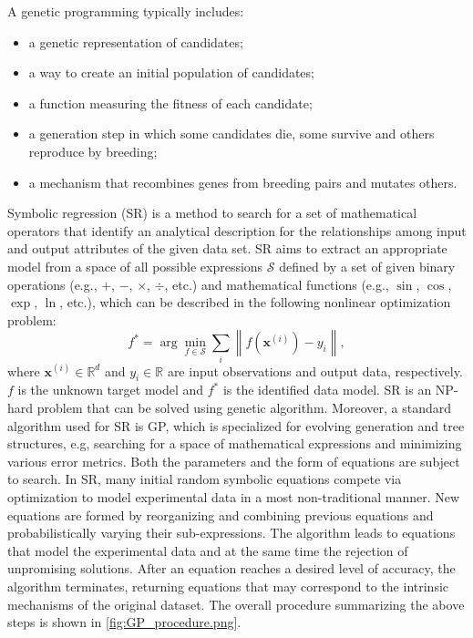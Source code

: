 \documentclass[final,5p,times,twocolumn]{elsarticle}
\begin{document}
A genetic programming typically includes:

\begin{itemize}
	\item{a genetic representation of candidates;}
	\item{a way to create an initial population of candidates;}
	\item{a function measuring the fitness of each candidate;}
	\item{a generation step in which some candidates die, some survive and others reproduce by breeding;}
	\item{a mechanism that recombines genes from breeding pairs and mutates others.}
\end{itemize}



Symbolic regression (SR) is a method to search for a set of mathematical operators that identify an analytical description for the relationships among input and output attributes of the given data set. SR aims to extract an appropriate model from a space of all possible expressions $\mathcal{S}$ defined by a set of given binary operations (e.g., $+$, $-$, $\times$, $\div$, etc.) and mathematical functions (e.g., $\sin$, $\cos$, $\exp$, $\ln$, etc.), which can be described in the following nonlinear optimization problem:
\begin{equation}
\label{SRdef}
f^*=\arg\min_{f \in \mathcal{S}}\sum_i\left\|{f(\mathbf{x}^{(i)})-y_i}\right\|,
\end{equation}
where $\mathbf{x}^{(i)}\in{\mathbb{R}^d}$ and $y_i\in{\mathbb{R}}$ are input observations and output data, respectively. $f$ is the unknown target model and $f^*$ is the identified data model. SR is an NP-hard problem that can be solved using genetic algorithm. Moreover, a standard algorithm used for SR is GP, which is specialized for evolving generation and tree structures, e.g, searching for a space of mathematical expressions and minimizing various error metrics. Both the parameters and the form of equations are subject to search. In SR, many initial random symbolic equations compete via optimization to model experimental data in a most non-traditional manner. New equations are formed by reorganizing and combining previous equations and probabilistically varying their sub-expressions. The algorithm leads to equations that model the experimental data and at the same time the rejection of unpromising solutions.  After an equation reaches a desired level of accuracy, the algorithm terminates, returning equations that may correspond to the intrinsic mechanisms of the original dataset\cite{schmidt2009distilling}. The overall procedure summarizing the above steps is shown in \autoref{fig:GP_procedure.png}.
\end{document}
